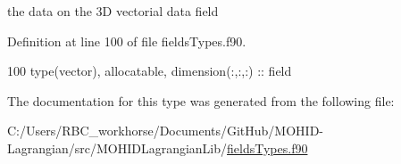 the data on the 3D vectorial data field 



Definition at line 100 of file fields\+Types.\+f90.


\begin{DoxyCode}
100         \textcolor{keywordtype}{type}(vector), \textcolor{keywordtype}{allocatable}, \textcolor{keywordtype}{dimension(:,:,:)} :: field
\end{DoxyCode}


The documentation for this type was generated from the following file\+:\begin{DoxyCompactItemize}
\item 
C\+:/\+Users/\+R\+B\+C\+\_\+workhorse/\+Documents/\+Git\+Hub/\+M\+O\+H\+I\+D-\/\+Lagrangian/src/\+M\+O\+H\+I\+D\+Lagrangian\+Lib/\mbox{\hyperlink{fields_types_8f90}{fields\+Types.\+f90}}\end{DoxyCompactItemize}
